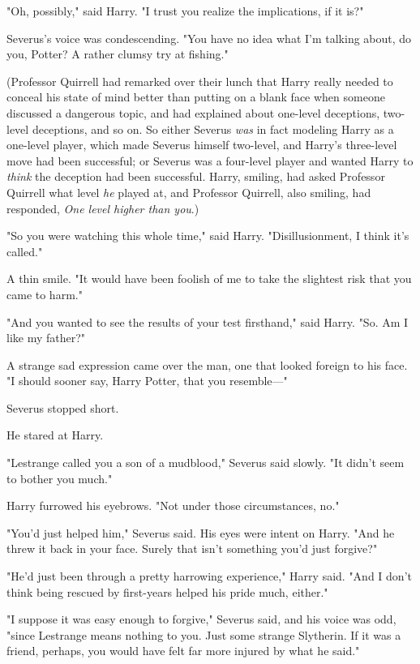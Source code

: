 "Oh, possibly," said Harry. "I trust you realize the implications, if it is?"

Severus's voice was condescending. "You have no idea what I'm talking about, do
you, Potter? A rather clumsy try at fishing."

(Professor Quirrell had remarked over their lunch that Harry really needed to
conceal his state of mind better than putting on a blank face when someone
discussed a dangerous topic, and had explained about one-level deceptions,
two-level deceptions, and so on. So either Severus \emph{was} in fact modeling
Harry as a one-level player, which made Severus himself two-level, and Harry's
three-level move had been successful; or Severus was a four-level player and
wanted Harry to \emph{think} the deception had been successful. Harry, smiling,
had asked Professor Quirrell what level \emph{he} played at, and Professor
Quirrell, also smiling, had responded, \emph{One level higher than you}.)

"So you were watching this whole time," said Harry. "Disillusionment, I think
it's called."

A thin smile. "It would have been foolish of me to take the slightest risk that
you came to harm."

"And you wanted to see the results of your test firsthand," said Harry. "So. Am
I like my father?"

A strange sad expression came over the man, one that looked foreign to his
face. "I should sooner say, Harry Potter, that you resemble---"

Severus stopped short.

He stared at Harry.

"Lestrange called you a son of a mudblood," Severus said slowly. "It didn't
seem to bother you much."

Harry furrowed his eyebrows. "Not under those circumstances, no."

"You'd just helped him," Severus said. His eyes were intent on Harry. "And he
threw it back in your face. Surely that isn't something you'd just forgive?"

"He'd just been through a pretty harrowing experience," Harry said. "And I
don't think being rescued by first-years helped his pride much, either."

"I suppose it was easy enough to forgive," Severus said, and his voice was odd,
"since Lestrange means nothing to you. Just some strange Slytherin. If it was a
friend, perhaps, you would have felt far more injured by what he said."

